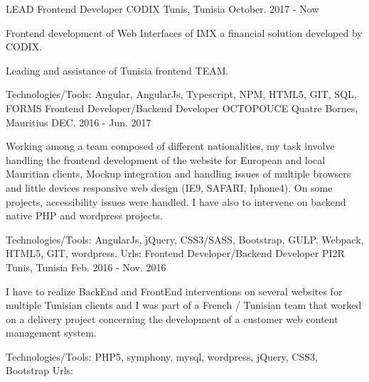 \begin{cventries}
  \techentries
    {LEAD Frontend Developer}
    {CODIX}
    {Tunis, Tunisia}
    {October. 2017 - Now}
    {
      \begin{cvitems}
        \item {Frontend development of Web Interfaces of IMX a financial solution developed by CODIX.}
        \item {Leading and assistance of Tunisia frontend TEAM.}
      \end{cvitems}
    }
    {\textcolor{awesome}{Technologies/Tools: } {\color{graytext}}  {Angular, AngularJs, Typescript, NPM, HTML5, GIT, SQL, FORMS}}
	{} 
    { 
    }
  \techentries
    {Frontend Developer/Backend Developer}
    {OCTOPOUCE}
    {Quatre Bornes, Mauritius}
    {DEC. 2016 - Jun. 2017}
    {
      \begin{cvitems}
        \item {Working among a team composed of different nationalities, my task involve handling the frontend development of the website for European and local Mauritian clients, Mockup integration and handling issues of multiple browsers and little devices responsive web design (IE9, SAFARI, Iphone4). On some projects, accessibility issues were handled. I have also to intervene on backend native PHP and wordpress projects.}
      \end{cvitems}
    }
    {\textcolor{awesome}{Technologies/Tools: } {\color{graytext}}  {AngularJs, jQuery, CSS3/SASS, Bootstrap, GULP, Webpack, HTML5, GIT, wordpress.}}
    {Urls:} 
    { \href{http://anahita.mu/}{ \break
    }}
  \techentries
    {Frontend Developer/Backend Developer}
    {PI2R}
    {Tunis, Tunisia}
    {Feb. 2016 - Nov. 2016}
    {
      \begin{cvitems}
        \item {I have to realize BackEnd and FrontEnd interventions on several websites for multiple Tunisian clients and I was part of a French / Tunisian team that worked on a delivery project concerning the development of a customer web content management system. }
      \end{cvitems}
    }
    {\textcolor{awesome}{Technologies/Tools: } {\color{graytext}}  {PHP5, symphony, mysql, wordpress, jQuery, CSS3, Bootstrap}}
    {Urls:} 
    {
    \href{http://www.milddream.com/fr/ }{} \break
}
\end{cventries}
